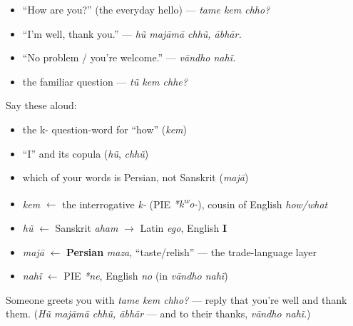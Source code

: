 \begin{itemize}
\raggedright
  \item \textquotedblleft{}How are you?\textquotedblright{} (the everyday hello) — \emph{tame kem chho?}
  \item \textquotedblleft{}I'm well, thank you.\textquotedblright{} — \emph{hũ majāmā chhũ, ābhār.}
  \item \textquotedblleft{}No problem / you're welcome.\textquotedblright{} — \emph{vāndho nahĩ.}
  \item the familiar question — \emph{tũ kem chhe?}
\end{itemize}

\begin{cousinweb}
Say these aloud:

\begin{itemize}
\raggedright
  \item the k- question-word for \textquotedblleft{}how\textquotedblright{} (\emph{kem})
  \item \textquotedblleft{}I\textquotedblright{} and its copula (\emph{hũ}, \emph{chhũ})
  \item which of your words is Persian, not Sanskrit (\emph{majā})
\end{itemize}
\end{cousinweb}

\begin{grammarlens}[title={What you've built — roots you now carry}]
\begin{itemize}
\raggedright
  \item \emph{kem} $\leftarrow$ the interrogative \emph{k-} (PIE \emph{*k\textsuperscript{w}o-}), cousin of English \emph{how/what}
  \item \emph{hũ} $\leftarrow$ Sanskrit \emph{aham} $\to$ Latin \emph{ego}, English \textbf{I}
  \item \emph{majā} $\leftarrow$ \textbf{Persian} \emph{maza}, \textquotedblleft{}taste/relish\textquotedblright{} — the trade-language layer
  \item \emph{nahĩ} $\leftarrow$ PIE \emph{*ne}, English \emph{no} (in \emph{vāndho nahĩ})
\end{itemize}
\end{grammarlens}

\begin{tcolorbox}[breakable,colback=teal!4,colframe=teal!35!black,title={Before you move on}]
Someone greets you with \emph{tame kem chho?} — reply that you're well and thank them. (\emph{Hũ majāmā chhũ, ābhār} — and to their thanks, \emph{vāndho nahĩ}.)
\end{tcolorbox}
